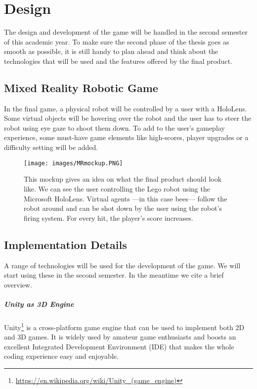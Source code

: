 
\chapter{Design}
The design and development of the game will be handled in the second semester of this academic year. To make sure the second phase of the thesis goes as smooth as possible, it is still handy to plan ahead and think about the technologies that will be used and the features offered by the final product.

\section{Mixed Reality Robotic Game}
In the final game, a physical robot will be controlled by a user with a HoloLens. Some virtual objects will be hovering over the robot and the user has to steer the robot using eye gaze to shoot them down. To add to the user's gameplay experience, some must-have game elements like high-scores, player upgrades or a difficulty setting will be added.

\begin{figure}[!htb]
	\texttt{[image: images/MRmockup.PNG]}
	\captionsetup{width=1.0\textwidth}
	\centering
	\caption{This mockup gives an idea on what the final product should look like. We can see the user controlling the Lego robot using the Microsoft HoloLens. Virtual agents ---in this case bees--- follow the robot around and can be shot down by the user using the robot's firing system. For every hit, the player's score increases.}
\end{figure}

\section{Implementation Details}
A range of technologies will be used for the development of the game. We will start using these in the second semester. In the meantime we cite a brief overview.

\paragraph{Unity as 3D Engine}
Unity\footnote{\protect\url{https://en.wikipedia.org/wiki/Unity\_(game\_engine)}} is a cross-platform game engine that can be used to implement both 2D and 3D games. It is widely used by amateur game enthusiasts and boosts an excellent Integrated Development Environment (IDE) that makes the whole coding experience easy and enjoyable. 

